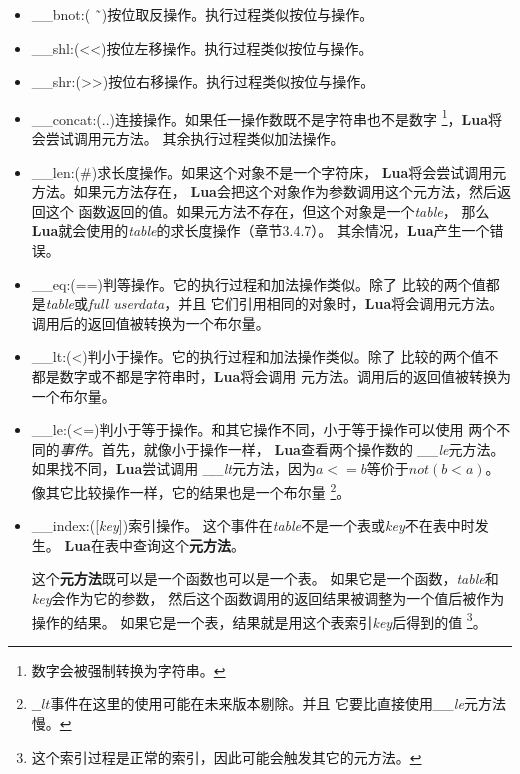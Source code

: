 \documentclass{ctexart}
\begin{document}
\begin{itemize}
\item \_\_bnot:( \~\ )按位取反操作。执行过程类似按位与操作。

\item \_\_shl:(<<)按位左移操作。执行过程类似按位与操作。

\item \_\_shr:(>>)按位右移操作。执行过程类似按位与操作。

\item \_\_concat:(..)连接操作。如果任一操作数既不是字符串也不是数字
\footnote{数字会被强制转换为字符串。}，\textbf{Lua}将会尝试调用元方法。
其余执行过程类似加法操作。

\item \_\_len:(\#)求长度操作。如果这个对象不是一个字符床，
\textbf{Lua}将会尝试调用元方法。如果元方法存在，
\textbf{Lua}会把这个对象作为参数调用这个元方法，然后返回这个
函数返回的值。如果元方法不存在，但这个对象是一个\emph{table}，
那么\textbf{Lua}就会使用的\emph{table}的求长度操作（章节3.4.7）。
其余情况，\textbf{Lua}产生一个错误。

\item \_\_eq:(==)判等操作。它的执行过程和加法操作类似。除了
比较的两个值都是\emph{table}或\emph{full userdata}，并且
它们引用相同的对象时，\textbf{Lua}将会调用元方法。
调用后的返回值被转换为一个布尔量。

\item \_\_lt:(<)判小于操作。它的执行过程和加法操作类似。除了
比较的两个值不都是数字或不都是字符串时，\textbf{Lua}将会调用
元方法。调用后的返回值被转换为一个布尔量。

\item \_\_le:(<=)判小于等于操作。和其它操作不同，小于等于操作可以使用
两个不同的\emph{事件}。首先，就像小于操作一样，
\textbf{Lua}查看两个操作数的
\emph{\_\_le}元方法。如果找不同，\textbf{Lua}尝试调用
\emph{\_\_lt}元方法，因为$a<=b$等价于$not (b<a)$。
像其它比较操作一样，它的结果也是一个布尔量
\footnote{$\_\_lt$事件在这里的使用可能在未来版本剔除。并且
它要比直接使用\emph{\_\_le}元方法慢。}。

\item \_\_index:([\emph{key}])索引操作。
这个事件在\emph{table}不是一个表或\emph{key}不在表中时发生。
\textbf{Lua}在表中查询这个\textbf{元方法}。

这个\textbf{元方法}既可以是一个函数也可以是一个表。
如果它是一个函数，\emph{table}和\emph{key}会作为它的参数，
然后这个函数调用的返回结果被调整为一个值后被作为操作的结果。
如果它是一个表，结果就是用这个表索引\emph{key}后得到的值
\footnote{这个索引过程是正常的索引，因此可能会触发其它的元方法。}。


\end{itemize}
\end{document}

